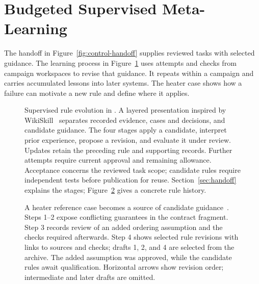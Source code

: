 \section{Budgeted Supervised Meta-Learning}
\label{sec:learning}

The handoff in Figure~\ref{fig:control-handoff} supplies reviewed tasks with selected guidance. The learning process in Figure~\ref{fig:handoff} uses attempts and checks from campaign workspaces to revise that guidance. It repeats within a campaign and carries accumulated lessons into later systems. The heater case shows how a failure can motivate a new rule and define where it applies.

\begin{figure}[t]
\centering

\caption{Supervised rule evolution in \workbench{}. A layered presentation inspired by WikiSkill~\cite{tang2026wikiskill} separates recorded evidence, cases and decisions, and candidate guidance. The four stages apply a candidate, interpret prior experience, propose a revision, and evaluate it under review. Updates retain the preceding rule and supporting records. Further attempts require current approval and remaining allowance. Acceptance concerns the reviewed task scope; candidate rules require independent tests before publication for reuse. Section~\ref{sec:handoff} explains the stages; Figure~\ref{fig:evolution} gives a concrete rule history.}
\label{fig:handoff}
\end{figure}


\begin{figure}[t]
\centering

\caption{A heater reference case becomes a source of candidate guidance~\cite{scpCheckpoint}. Steps 1--2 expose conflicting guarantees in the contract fragment. Step 3 records review of an added ordering assumption and the checks required afterwards. Step 4 shows selected rule revisions with links to sources and checks; drafts 1, 2, and 4 are selected from the archive. The added assumption was approved, while the candidate rules await qualification. Horizontal arrows show revision order; intermediate and later drafts are omitted.}
\label{fig:evolution}
\end{figure}

